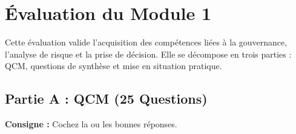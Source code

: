 \chapter{Évaluation du Module 1}
\label{chap:evalmod1}

Cette évaluation valide l'acquisition des compétences liées à la gouvernance, l'analyse de risque et la prise de décision. Elle se décompose en trois parties : QCM, questions de synthèse et mise en situation pratique.

\section{Partie A : QCM (25 Questions)}

\textbf{Consigne :} Cochez la ou les bonnes réponses.

